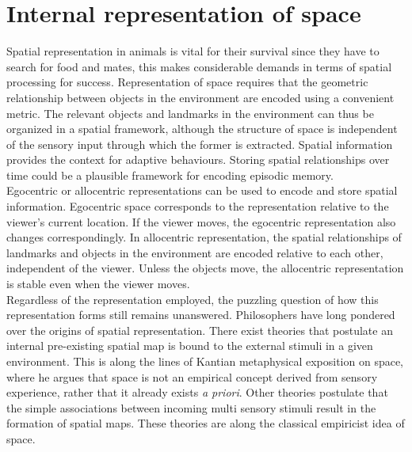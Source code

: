 \section{Internal representation of space} 

\label{space} 


Spatial representation in animals is vital for their survival since they have to search for food and mates, this makes considerable demands in terms of spatial processing for success. Representation of space requires that the geometric relationship between objects in the environment are encoded using a convenient metric. The relevant objects and landmarks in the environment can thus be organized in a spatial framework, although the structure of space is independent of the sensory input through which the former is extracted. Spatial information provides the context for adaptive behaviours. Storing spatial relationships over time could be a plausible framework for encoding episodic memory. \\
Egocentric or allocentric representations can be used to encode and store spatial information. Egocentric space corresponds to the representation relative to the viewer's current location. If the viewer moves, the egocentric representation also changes correspondingly. In allocentric representation, the spatial relationships of landmarks and objects in the environment are encoded relative to each other, independent of the viewer. Unless the objects move, the allocentric representation is stable even when the viewer moves.\\
Regardless of the representation employed, the puzzling question of how this representation forms still remains unanswered. Philosophers have long pondered over the origins of spatial representation. There exist theories that postulate an internal pre-existing spatial map is bound to the external stimuli in a given environment. This is along the lines of Kantian metaphysical exposition on space, where he argues that space is not an empirical concept derived from sensory experience, rather that it already exists \emph{a priori}. Other theories postulate that the simple associations between incoming multi sensory stimuli result in the formation of spatial maps. These theories are along the classical empiricist idea of space. 

